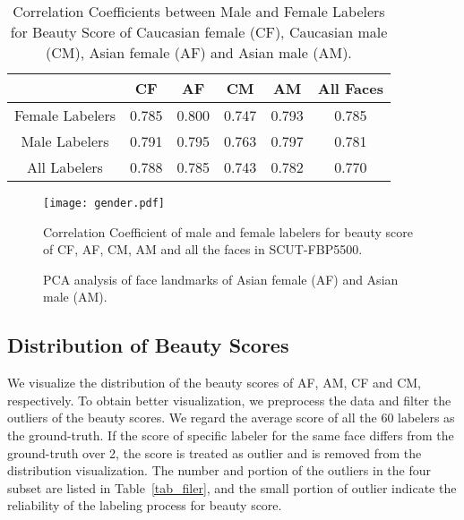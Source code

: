 \documentclass[10pt,conference,a4paper]{IEEEtran}
\begin{document}
\begin{table}[t]
\centering
\caption{Correlation Coefficients between Male and Female Labelers for Beauty Score of Caucasian female (CF), Caucasian male (CM), Asian female (AF) and Asian male (AM).}
\label{tab_gender}
\begin{tabular}{|c||c|c|c|c|c|}
\hline
 & CF & AF & CM & AM & All Faces\\
\hline
Female Labelers & 0.785 & 0.800 & 0.747 & 0.793 & 0.785 \\
\hline
Male Labelers & 0.791 & 0.795 & 0.763 & 0.797 & 0.781 \\
\hline
All Labelers & 0.788 & 0.785 & 0.743 & 0.782 & 0.770 \\
\hline
\end{tabular}
\end{table}

\begin{figure}[t]
\centering
\texttt{[image: gender.pdf]}
\caption{Correlation Coefficient of male and female labelers for beauty score of CF, AF, CM, AM and all the faces in SCUT-FBP5500.}
\label{fig_gender}
\end{figure}

\begin{figure}[!t]
\centering
{}

\caption{PCA analysis of face landmarks of Asian female (AF) and Asian male (AM).}
\label{fig_pca}
\end{figure}

\subsection{Distribution of Beauty Scores}
We visualize the distribution of the beauty scores of AF, AM, CF and CM, respectively. To obtain better visualization, we preprocess the data and filter the outliers of the beauty scores. We regard the average score of all the 60 labelers as the ground-truth. If the score of specific labeler for the same face differs from the ground-truth over 2, the score is treated as outlier and is removed from the distribution visualization. The number and portion of the outliers in the four subset are listed in Table~\ref{tab_filer}, and the small portion of outlier indicate the reliability of the labeling process for beauty score.
\end{document}
